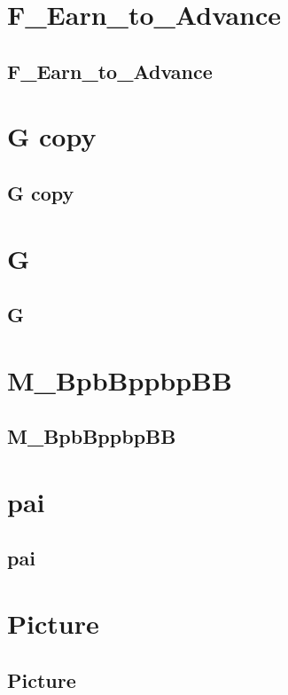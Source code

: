 \section{F_Earn_to_Advance}
\subsection{F_Earn_to_Advance}
\raggedbottom
\hrulefill

\section{G copy}
\subsection{G copy}
\raggedbottom
\hrulefill

\section{G}
\subsection{G}
\raggedbottom
\hrulefill

\section{M_BpbBppbpBB}
\subsection{M_BpbBppbpBB}
\raggedbottom
\hrulefill

\section{pai}
\subsection{pai}
\raggedbottom
\hrulefill

\section{Picture}
\subsection{Picture}
\raggedbottom
\hrulefill

